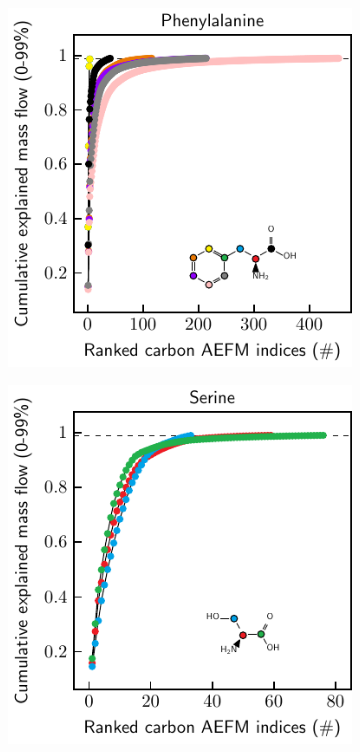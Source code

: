 \documentclass[]{article}
\begin{document}
\begin{figure}
\begin{subfigure}[t]{0.247\textwidth}
    \end{subfigure}
    \begin{subfigure}[t]{0.247\textwidth}
        \caption{}
        \includegraphics[width=\textwidth]{subpanels/cumulative-source-met-29-legend.pdf}\\
    \end{subfigure}
    \begin{subfigure}[t]{0.247\textwidth}
        \caption{}
        \includegraphics[width=\textwidth]{subpanels/cumulative-source-met-33-legend.pdf}\\
    \end{subfigure}


\end{figure}
\end{document}
